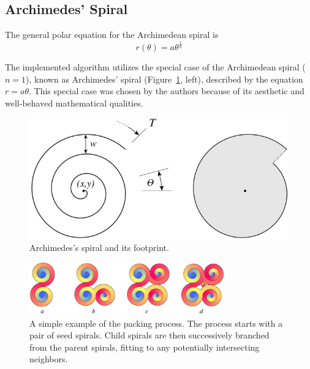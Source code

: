 \documentclass[11pt]{IEEEtran}
\begin{document}
\subsection{Archimedes' Spiral}	
The general polar equation for the Archimedean spiral is 
\begin{equation} 
\label{eq:1} 
	r(\theta) = a\theta^\frac{1}{n} 
\end{equation}

The implemented algorithm utilizes the special case of the Archimedean spiral (\begin{math}n=1\end{math}), known as Archimedes' spiral (Figure~\ref{fig:spiral}, left), described by the equation \begin{math} r = a\theta \end{math}. This special case was chosen by the authors because of its aesthetic and well-behaved mathematical qualities.\cite{Browne2006834}
	
\begin{figure}[h]
\centering
\includegraphics[width=0.9\linewidth]{spiral-packing-fig-02}
\caption{Archimedes's spiral and its footprint. \cite{Browne2006834}}
\label{fig:spiral}
\end{figure}

\begin{figure}[b!]
\centering
\includegraphics[width=0.75\textwidth]{spiral-branching}
\caption{A simple example of the packing process. The process starts with a pair of seed spirals. Child spirals are then successively branched from the parent spirals, fitting to any potentially intersecting neighbors.}
\label{fig:branch}
\end{figure}
\end{document}
